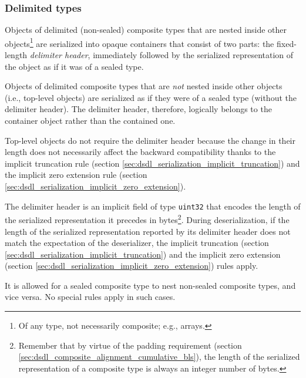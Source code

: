 \subsubsection{Delimited types}\label{sec:dsdl_serialization_composite_non_sealed}

Objects of delimited (non-sealed) composite types that are nested inside other objects\footnote{%
    Of any type, not necessarily composite; e.g., arrays.
}
are serialized into opaque containers that consist of two parts:
the fixed-length \emph{delimiter header},
immediately followed by the serialized representation of the object as if it was of a sealed type.

Objects of delimited composite types that are \emph{not} nested inside other objects (i.e., top-level objects)
are serialized as if they were of a sealed type (without the delimiter header).
The delimiter header, therefore, logically belongs to the container object rather than the contained one.

\begin{remark}
    Top-level objects do not require the delimiter header because the change in their length does not necessarily
    affect the backward compatibility thanks to the implicit truncation rule
    (section \ref{sec:dsdl_serialization_implicit_truncation}) and the implicit zero extension rule
    (section \ref{sec:dsdl_serialization_implicit_zero_extension}).
\end{remark}

The delimiter header is an implicit field of type \verb|uint32| that encodes the length of the
serialized representation it precedes in bytes\footnote{%
    Remember that by virtue of the padding requirement (section \ref{sec:dsdl_composite_alignment_cumulative_bls}),
    the length of the serialized representation of a composite type is always an integer number of bytes.
}.
During deserialization, if the length of the serialized representation reported by its delimiter header
does not match the expectation of the deserializer,
the implicit truncation (section \ref{sec:dsdl_serialization_implicit_truncation})
and the implicit zero extension (section \ref{sec:dsdl_serialization_implicit_zero_extension})
rules apply.

It is allowed for a sealed composite type to nest non-sealed composite types, and vice versa.
No special rules apply in such cases.

